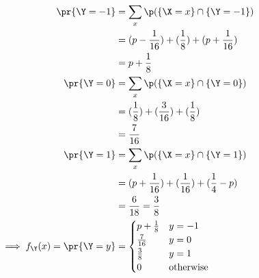 \begin{align*}
\pr{\Y = -1} &= \sum _x \p(\{ \X = x \} \cap \{ \Y = -1 \}) \\
&= (p - \frac{1}{16}) + (\frac{1}{8}) + (p + \frac{1}{16}) \\
&= p + \frac{1}{8} \\
\pr{\Y = 0} &= \sum _x \p(\{ \X = x \} \cap \{ \Y = 0 \}) \\
&= (\frac{1}{8}) + (\frac{3}{16}) + (\frac{1}{8}) \\
&= \frac{7}{16} \\
\pr{\Y = 1} &= \sum _x \p(\{ \X = x \} \cap \{ \Y = 1 \}) \\
&= (p + \frac{1}{16}) + (\frac{1}{16}) + (\frac{1}{4} - p) \\
&= \frac{6}{18} = \frac{3}{8} \\
\implies f_{\Y}(x) = \pr{\Y = y} &= \begin{cases}
p + \frac{1}{8} & y = -1 \\
\frac{7}{16} & y = 0 \\
\frac{3}{8} & y = 1 \\
0 & \text{otherwise}
\end{cases}
\end{align*}
